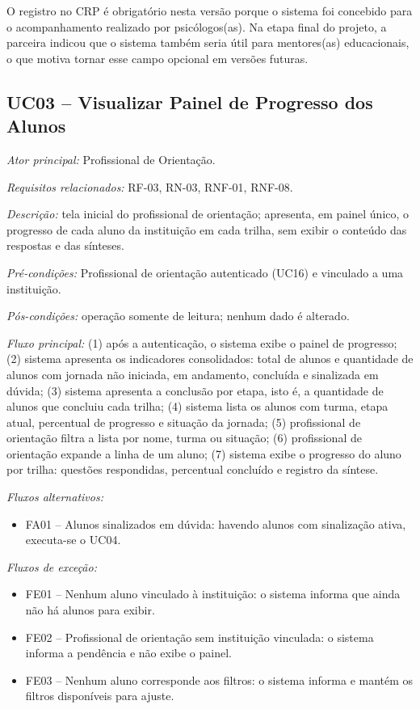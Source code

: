 O registro no CRP é obrigatório nesta versão porque o sistema foi concebido para o acompanhamento realizado por psicólogos(as). Na etapa final do projeto, a parceira indicou que o sistema também seria útil para mentores(as) educacionais, o que motiva tornar esse campo opcional em versões futuras.

\subsection*{UC03 -- Visualizar Painel de Progresso dos Alunos}\label{uc:uc03}

\textit{Ator principal:} Profissional de Orientação.

\textit{Requisitos relacionados:} RF-03, RN-03, RNF-01, RNF-08.

\textit{Descrição:} tela inicial do profissional de orientação; apresenta, em painel único, o progresso de cada aluno da instituição em cada trilha, sem exibir o conteúdo das respostas e das sínteses.

\textit{Pré-condições:} Profissional de orientação autenticado (UC16) e vinculado a uma instituição.

\textit{Pós-condições:} operação somente de leitura; nenhum dado é alterado.

\textit{Fluxo principal:} (1) após a autenticação, o sistema exibe o painel de progresso; (2) sistema apresenta os indicadores consolidados: total de alunos e quantidade de alunos com jornada não iniciada, em andamento, concluída e sinalizada em dúvida; (3) sistema apresenta a conclusão por etapa, isto é, a quantidade de alunos que concluiu cada trilha; (4) sistema lista os alunos com turma, etapa atual, percentual de progresso e situação da jornada; (5) profissional de orientação filtra a lista por nome, turma ou situação; (6) profissional de orientação expande a linha de um aluno; (7) sistema exibe o progresso do aluno por trilha: questões respondidas, percentual concluído e registro da síntese.

\textit{Fluxos alternativos:}

\begin{itemize}[label={},leftmargin=\parindent,itemsep=0pt,topsep=0pt]
  \item FA01 – Alunos sinalizados em dúvida: havendo alunos com sinalização ativa, executa-se o UC04.
\end{itemize}

\textit{Fluxos de exceção:}

\begin{itemize}[label={},leftmargin=\parindent,itemsep=0pt,topsep=0pt]
  \item FE01 – Nenhum aluno vinculado à instituição: o sistema informa que ainda não há alunos para exibir.
  \item FE02 – Profissional de orientação sem instituição vinculada: o sistema informa a pendência e não exibe o painel.
  \item FE03 – Nenhum aluno corresponde aos filtros: o sistema informa e mantém os filtros disponíveis para ajuste.
\end{itemize}

